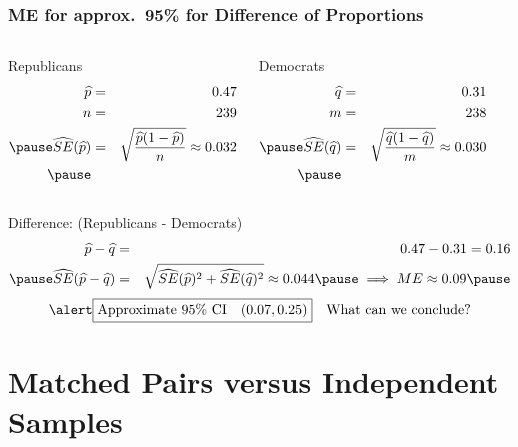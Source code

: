 \begin{frame}
\frametitle{ME for approx.\ 95\% for Difference of Proportions}

\footnotesize
{}
\singlespacing
\begin{columns} 
	\begin{block}{Republicans}
		\begin{eqnarray*}
			\widehat{p} &=& 0.47\\
			n &=& 239\\  \pause
			\widehat{SE}(\widehat{p}) &=&\sqrt{ \frac{\widehat{p}(1-\widehat{p})}{n}} \approx 0.032 \\ \pause
		\end{eqnarray*}
	\end{block}
	
		\begin{block}{Democrats}
		\begin{eqnarray*}
			\widehat{q} &=& 0.31\\
			m &=& 238\\  \pause
			\widehat{SE}(\widehat{q}) &=& \sqrt{\frac{\widehat{q}(1-\widehat{q})}{m}} \approx 0.030\\ \pause
		\end{eqnarray*}
	\end{block}
\end{columns}

\begin{block}{Difference: (Republicans - Democrats)}
	\begin{eqnarray*}
		\widehat{p} - \widehat{q} &=& 0.47 - 0.31 = 0.16\\ \pause
		\widehat{SE}(\widehat{p} - \widehat{q}) &=& \sqrt{\widehat{SE}(\widehat{p})^2 + \widehat{SE}(\widehat{q})^2} \approx 0.044  \pause \implies ME \approx 0.09 \pause 
	\end{eqnarray*}
	$$\alert{\boxed{\mbox{Approximate 95\% CI} \quad (0.07, 0.25)}} \quad \mbox{What can we conclude?}$$
\end{block}

\end{frame}
\section{Matched Pairs versus Independent Samples}

